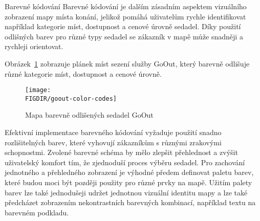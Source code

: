 \begin{subsection}{Barevné kódování}
    \label{subsec:identifikace-interaktivni-mapa-barevne-kody}
    Barevné kódování je dalším zásadním aspektem vizuálního zobrazení mapy místa konání, jelikož pomáhá uživatelům rychle identifikovat například kategorie míst, dostupnost a cenové úrovně sedadel.
    Díky použití odlišných barev pro různé typy sedadel se zákazník v mapě může snadněji a rychleji orientovat.

    Obrázek~\ref{fig:goout-color-codes} zobrazuje plánek míst sezení služby GoOut, který barevně odlišuje různé kategorie míst, dostupnost a cenové úrovně.

    \begin{figure}[H]
        \centering
        \caption{Mapa barevně odlišených sedadel GoOut}
        \texttt{[image: \\FIGDIR/goout-color-codes]}
        \label{fig:goout-color-codes}
    \end{figure}

    Efektivní implementace barevného kódování vyžaduje použití snadno rozlišitelných barev, které vyhovují zákazníkům s různými zrakovými schopnostmi.
    Zvolené barevné schéma by mělo zlepšit přehlednost a zvýšit uživatelský komfort tím, že zjednoduší proces výběru sedadel.
    Pro zachování jednotného a přehledného zobrazení je výhodné předem definovat paletu barev, které budou moci být později použity pro různé prvky na mapě.
    Užitím palety barev lze také jednodušeji udržet jednotnou vizuální identitu mapy a lze také předcházet zobrazením nekontrastních barevných kombinací, například textu na barevném podkladu.
\end{subsection}

